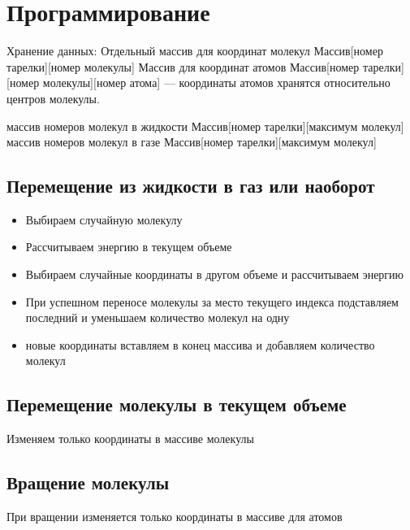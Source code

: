\section{Программирование}

Хранение данных:
Отдельный массив для координат молекул  Массив[номер тарелки][номер молекулы]
Массив для координат атомов Массив[номер тарелки][номер молекулы][номер атома] --- координаты атомов хранятся относительно центров молекулы. 

массив номеров молекул в жидкости Массив[номер тарелки][максимум молекул]
массив номеров молекул в газе Массив[номер тарелки][максимум молекул]

\subsection{Перемещение из жидкости в газ или наоборот}
\begin{itemize}
	\item Выбираем случайную молекулу
	\item Рассчитываем энергию в текущем объеме
	\item Выбираем случайные координаты в другом объеме и рассчитываем энергию
	\item При успешном переносе молекулы за место текущего индекса подставляем последний и уменьшаем количество молекул на одну
	\item новые координаты вставляем в конец массива и добавляем количество молекул
\end{itemize}

\subsection{Перемещение молекулы в текущем объеме}
Изменяем только координаты в массиве молекулы

\subsection{Вращение молекулы}
При вращении изменяется только координаты в массиве для атомов